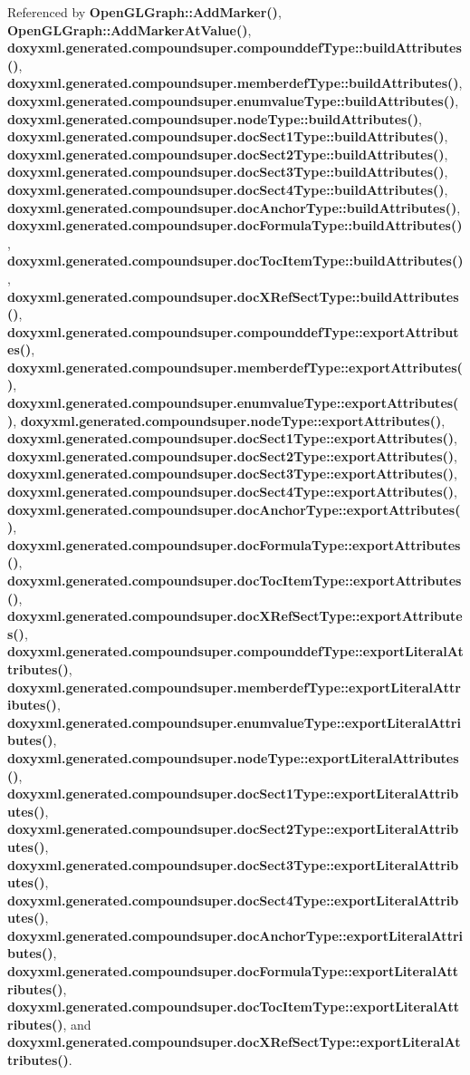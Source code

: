 Referenced by {\bf Open\+G\+L\+Graph\+::\+Add\+Marker()}, {\bf Open\+G\+L\+Graph\+::\+Add\+Marker\+At\+Value()}, {\bf doxyxml.\+generated.\+compoundsuper.\+compounddef\+Type\+::build\+Attributes()}, {\bf doxyxml.\+generated.\+compoundsuper.\+memberdef\+Type\+::build\+Attributes()}, {\bf doxyxml.\+generated.\+compoundsuper.\+enumvalue\+Type\+::build\+Attributes()}, {\bf doxyxml.\+generated.\+compoundsuper.\+node\+Type\+::build\+Attributes()}, {\bf doxyxml.\+generated.\+compoundsuper.\+doc\+Sect1\+Type\+::build\+Attributes()}, {\bf doxyxml.\+generated.\+compoundsuper.\+doc\+Sect2\+Type\+::build\+Attributes()}, {\bf doxyxml.\+generated.\+compoundsuper.\+doc\+Sect3\+Type\+::build\+Attributes()}, {\bf doxyxml.\+generated.\+compoundsuper.\+doc\+Sect4\+Type\+::build\+Attributes()}, {\bf doxyxml.\+generated.\+compoundsuper.\+doc\+Anchor\+Type\+::build\+Attributes()}, {\bf doxyxml.\+generated.\+compoundsuper.\+doc\+Formula\+Type\+::build\+Attributes()}, {\bf doxyxml.\+generated.\+compoundsuper.\+doc\+Toc\+Item\+Type\+::build\+Attributes()}, {\bf doxyxml.\+generated.\+compoundsuper.\+doc\+X\+Ref\+Sect\+Type\+::build\+Attributes()}, {\bf doxyxml.\+generated.\+compoundsuper.\+compounddef\+Type\+::export\+Attributes()}, {\bf doxyxml.\+generated.\+compoundsuper.\+memberdef\+Type\+::export\+Attributes()}, {\bf doxyxml.\+generated.\+compoundsuper.\+enumvalue\+Type\+::export\+Attributes()}, {\bf doxyxml.\+generated.\+compoundsuper.\+node\+Type\+::export\+Attributes()}, {\bf doxyxml.\+generated.\+compoundsuper.\+doc\+Sect1\+Type\+::export\+Attributes()}, {\bf doxyxml.\+generated.\+compoundsuper.\+doc\+Sect2\+Type\+::export\+Attributes()}, {\bf doxyxml.\+generated.\+compoundsuper.\+doc\+Sect3\+Type\+::export\+Attributes()}, {\bf doxyxml.\+generated.\+compoundsuper.\+doc\+Sect4\+Type\+::export\+Attributes()}, {\bf doxyxml.\+generated.\+compoundsuper.\+doc\+Anchor\+Type\+::export\+Attributes()}, {\bf doxyxml.\+generated.\+compoundsuper.\+doc\+Formula\+Type\+::export\+Attributes()}, {\bf doxyxml.\+generated.\+compoundsuper.\+doc\+Toc\+Item\+Type\+::export\+Attributes()}, {\bf doxyxml.\+generated.\+compoundsuper.\+doc\+X\+Ref\+Sect\+Type\+::export\+Attributes()}, {\bf doxyxml.\+generated.\+compoundsuper.\+compounddef\+Type\+::export\+Literal\+Attributes()}, {\bf doxyxml.\+generated.\+compoundsuper.\+memberdef\+Type\+::export\+Literal\+Attributes()}, {\bf doxyxml.\+generated.\+compoundsuper.\+enumvalue\+Type\+::export\+Literal\+Attributes()}, {\bf doxyxml.\+generated.\+compoundsuper.\+node\+Type\+::export\+Literal\+Attributes()}, {\bf doxyxml.\+generated.\+compoundsuper.\+doc\+Sect1\+Type\+::export\+Literal\+Attributes()}, {\bf doxyxml.\+generated.\+compoundsuper.\+doc\+Sect2\+Type\+::export\+Literal\+Attributes()}, {\bf doxyxml.\+generated.\+compoundsuper.\+doc\+Sect3\+Type\+::export\+Literal\+Attributes()}, {\bf doxyxml.\+generated.\+compoundsuper.\+doc\+Sect4\+Type\+::export\+Literal\+Attributes()}, {\bf doxyxml.\+generated.\+compoundsuper.\+doc\+Anchor\+Type\+::export\+Literal\+Attributes()}, {\bf doxyxml.\+generated.\+compoundsuper.\+doc\+Formula\+Type\+::export\+Literal\+Attributes()}, {\bf doxyxml.\+generated.\+compoundsuper.\+doc\+Toc\+Item\+Type\+::export\+Literal\+Attributes()}, and {\bf doxyxml.\+generated.\+compoundsuper.\+doc\+X\+Ref\+Sect\+Type\+::export\+Literal\+Attributes()}.

